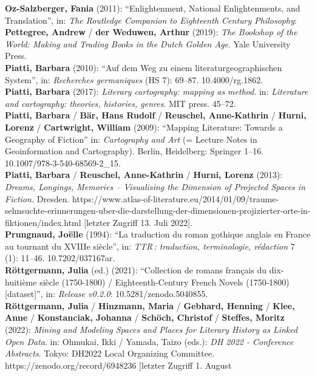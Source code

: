\documentclass[
  12pt,
  letterpaper,
  DIV=11,
  numbers=noendperiod]{scrreprt}
\begin{document}
\textbf{Oz-Salzberger, Fania} (2011): ``Enlightenment, National
Enlightenments, and Translation'', in: \emph{The Routledge Companion to
Eighteenth Century Philosophy}:\\
\textbf{Pettegree, Andrew} / \textbf{der Weduwen, Arthur} (2019):
\emph{The Bookshop of the World: Making and Trading Books in the Dutch
Golden Age}. Yale University Press.\\
\textbf{Piatti, Barbara} (2010): ``Auf dem Weg zu einem
literaturgeographischen System'', in: \emph{Recherches germaniques} (HS
7): 69--87. 10.4000/rg.1862.\\
\textbf{Piatti, Barbara} (2017): \emph{Literary cartography: mapping as
method}. in: \emph{Literature and cartography: theories, histories,
genres}. MIT press. 45--72.\\
\textbf{Piatti, Barbara} / \textbf{Bär, Hans Rudolf} / \textbf{Reuschel,
Anne-Kathrin} / \textbf{Hurni, Lorenz} / \textbf{Cartwright, William}
(2009): ``Mapping Literature: Towards a Geography of Fiction'' in:
\emph{Cartography and Art} (= Lecture Notes in Geoinformation and
Cartography). Berlin, Heidelberg: Springer 1--16.
10.1007/978-3-540-68569-2\_15.\\
\textbf{Piatti, Barbara} / \textbf{Reuschel, Anne-Kathrin} /
\textbf{Hurni, Lorenz} (2013): \emph{Dreams, Longings, Memories --
Visualising the Dimension of Projected Spaces in Fiction.} Dresden.
https://www.atlas-of-literature.eu/2014/01/09/traume-sehnsuchte-erinnerungen-uber-die-darstellung-der-dimensionen-projizierter-orte-in-fiktionen/index.html
{[}letzter Zugriff 13. Juli 2022{]}.\\
\textbf{Prungnaud, Joëlle} (1994): ``La traduction du roman gothique
anglais en France au tournant du XVIIIe siècle'', in: \emph{TTR\,:
traduction, terminologie, rédaction} 7 (1): 11--46. 10.7202/037167ar.\\
\textbf{Röttgermann, Julia} (ed.) (2021): ``Collection de romans
français du dix-huitième siècle (1750-1800) / Eighteenth-Century French
Novels (1750-1800)~ {[}dataset{]}'', in: \emph{Release v0.2.0}:
10.5281/zenodo.5040855.\\
\textbf{Röttgermann, Julia} / \textbf{Hinzmann, Maria} /
\textbf{Gebhard, Henning} / \textbf{Klee, Anne} / \textbf{Konstanciak,
Johanna} / \textbf{Schöch, Christof} / \textbf{Steffes, Moritz} (2022):
\emph{Mining and Modeling Spaces and Places for Literary History as
Linked Open Data}. in: Ohmukai, Ikki / Yamada, Taizo (eds.): \emph{DH
2022 - Conference Abstracts}. Tokyo: DH2022 Local Organizing Committee.
https://zenodo.org/record/6948236 {[}letzter Zugriff 1. August
\end{document}
